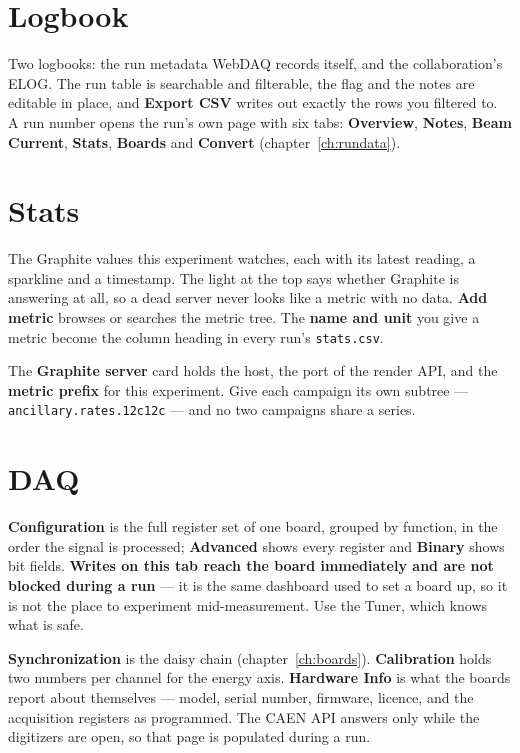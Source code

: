 \documentclass[11pt,a4paper]{report}
\newcommand{\cmd}[1]{\texttt{#1}}
\newcommand{\ui}[1]{\textbf{#1}}          %
\newcommand{\file}[1]{\texttt{#1}}
\begin{document}
\section{Logbook}

Two logbooks: the run metadata WebDAQ records itself, and the collaboration's
ELOG. The run table is searchable and filterable, the flag and the notes are
editable in place, and \ui{Export CSV} writes out exactly the rows you filtered
to. A run number opens the run's own page with six tabs: \ui{Overview},
\ui{Notes}, \ui{Beam Current}, \ui{Stats}, \ui{Boards} and \ui{Convert}
(chapter~\ref{ch:rundata}).

\section{Stats}

The Graphite values this experiment watches, each with its latest reading, a
sparkline and a timestamp. The light at the top says whether Graphite is
answering at all, so a dead server never looks like a metric with no data.
\ui{Add metric} browses or searches the metric tree. The \textbf{name and unit}
you give a metric become the column heading in every run's \file{stats.csv}.

The \ui{Graphite server} card holds the host, the port of the render API, and the
\textbf{metric prefix} for this experiment. Give each campaign its own subtree ---
\cmd{ancillary.rates.12c12c} --- and no two campaigns share a series.

\section{DAQ}

\ui{Configuration} is the full register set of one board, grouped by function, in
the order the signal is processed; \ui{Advanced} shows every register and
\ui{Binary} shows bit fields. \textbf{Writes on this tab reach the board
immediately and are not blocked during a run} --- it is the same dashboard used to
set a board up, so it is not the place to experiment mid-measurement. Use the
Tuner, which knows what is safe.

\ui{Synchronization} is the daisy chain (chapter~\ref{ch:boards}).
\ui{Calibration} holds two numbers per channel for the energy axis.
\ui{Hardware Info} is what the boards report about themselves --- model, serial
number, firmware, licence, and the acquisition registers as programmed. The CAEN
API answers only while the digitizers are open, so that page is populated during a
run.
\end{document}
